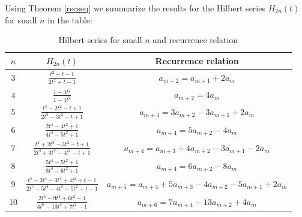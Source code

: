 \documentclass{amsart}[12pt]
\theoremstyle{definition}
\begin{document}
Using Theorem \ref{recseq} we summarize the results for the Hilbert series $H_{2n}(t)$ for small $n$ in the table:
\begin{table}[h!]
	\centering
	\begin{tabular}{|c|c|c|}
		\hline
		$n$ & $H_{2n}(t)$ & \textbf{Recurrence relation} \\
		\hline \hline
		$3$ & $\frac{t^2+t-1}{2t^2+t-1}$ & $a_{m+2} = a_{m+1} + 2a_m$ \\ [0.2cm]
		\hline
		$4$ & $\frac{1-3t^2}{1-4t^2}$  & $a_{m+2} = 4a_m$ \\ [0.2cm]
		\hline
		5 &  $\frac{t^3-2t^2-t+1}{2t^3-3t^2-t+1}$& $a_{m+3} = 3a_{m+2} - 3a_{m+1} + 2a_m$ \\ [0.2cm]
		\hline
		6 & $\frac{ 2t^4-4t^2+1}{4t^4-5t^2+1}$ & $a_{m+4} = 5a_{m+2}- 4a_m$ \\ [0.2cm]
		\hline
		7 &  $\frac{t^4+2t^3-3t^2-t+1}{2t^4+3t^3-4t^2-t+1}$ & $a_{m+4} = a_{m+3} + 4a_{m+2} - 3a_{m+1} - 2a_m$ \\ [0.2cm]
		\hline
		8 & $\frac{5t^4-5t^2+1}{8t^4-6t^2+1}$  & $a_{m+4} = 6a_{m+2} - 8a_m$\\ [0.2cm]
		\hline
		9 & $\frac{t^5-3t^4-3t^3+4t^2+t-1}{2t^5-5t^4-4t^3+5t^2+t-1}$   & {\small $a_{m+5} = a_{m+4} + 5a_{m+3} - 4a_{m+2} -5a_{m+1} + 2a_m$} \\ [0.2cm]
		\hline 	
		10 & $\frac{2t^6-9t^4+6t^2-1}{4t^6-13t^4+7t^2-1}$  & $a_{m+6} = 7a_{m+4} - 13a_{m+2} + 4a_m$ \\ [0.2cm]
		\hline
	\end{tabular}
	\caption{Hilbert series for small $n$ and recurrence relation}
\end{table}
\end{document}
